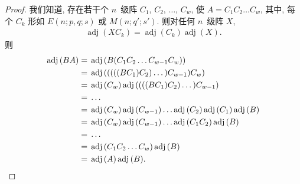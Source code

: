 \documentclass[../libro.tex]{subfiles}
\begin{document}
\begin{proof}
    我们知道,
    存在若干个 \(n\)~级阵
    \(C_1\), \(C_2\), \(\dots\), \(C_w\),
    使 \(A = C_1 C_2 \dots C_w\),
    其中, 每个 \(C_k\) 形如
    \(E(n; p, q; s)\) 或 \(M(n; q'; s')\).
    则对任何 \(n\)~级阵 \(X\),
    \begin{align*}
        \operatorname{adj} {(X C_k)}
        = \operatorname{adj} {(C_k)} \operatorname{adj} {(X)}.
    \end{align*}
    则
    \begin{align*}
        \operatorname{adj} {(B A)}
        = {} &
        \operatorname{adj} {(B (C_1 C_2 \dots C_{w-1} C_w))}
        \\
        = {} &
        \operatorname{adj}
        {(((((B C_1) C_2) \dots) C_{w-1}) C_w)}
        \\
        = {} &
        \operatorname{adj} {(C_w)}
        \operatorname{adj}
        {((((B C_1) C_2) \dots) C_{w-1})}
        \\
        = {} &
        \dots
        \\
        = {} &
        \operatorname{adj} {(C_w)}
        \operatorname{adj} {(C_{w-1})}
        \dots
        \operatorname{adj} {(C_2)}
        \operatorname{adj} {(C_1)}
        \operatorname{adj} {(B)}
        \\
        = {} &
        \operatorname{adj} {(C_w)}
        \operatorname{adj} {(C_{w-1})}
        \dots
        \operatorname{adj} {(C_1 C_2)}
        \operatorname{adj} {(B)}
        \\
        = {} &
        \dots
        \\
        = {} &
        \operatorname{adj} {(C_1 C_2 \dots C_w)}
        \operatorname{adj} {(B)}
        \\
        = {} &
        \operatorname{adj} {(A)}
        \operatorname{adj} {(B)}.
        \qedhere
    \end{align*}
\end{proof}

\end{document}

